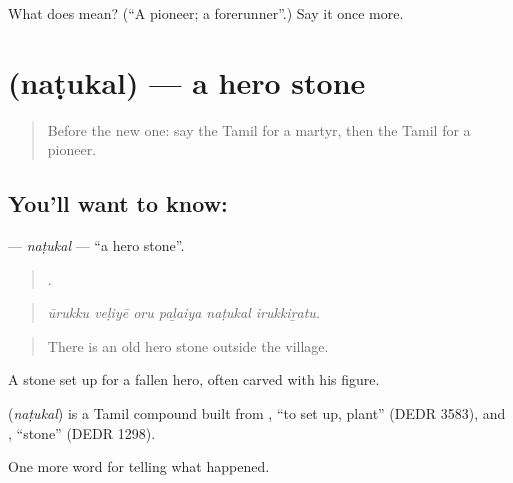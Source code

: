 \begin{tcolorbox}[breakable,colback=teal!4,colframe=teal!35!black,title={Before you move on}]
What does  mean? (\textquotedblleft{}A pioneer; a forerunner\textquotedblright{}.) Say it once more.
\end{tcolorbox}
\section[\texorpdfstring{\ta{நடுகல்} (naṭukal)}{நடுகல் (naṭukal)}]{ (naṭukal) — a hero stone}

\label{lesson:TA-C339-natukal}



\begin{quote}
Before the new one: say the Tamil for a martyr, then the Tamil for a pioneer.
\end{quote}

\subsection*{You'll want to know: }
\textbf{} — \emph{naṭukal} — \textquotedblleft{}a hero stone\textquotedblright{}.

\begin{quote}
     .
\end{quote}

\begin{quote}
\emph{ūrukku veḷiyē oru paḻaiya naṭukal irukkiṟatu.}
\end{quote}

\begin{quote}
There is an old hero stone outside the village.
\end{quote}

A stone set up for a fallen hero, often carved with his figure.

\begin{cousinweb}
\textbf{} (\emph{naṭukal}) is a Tamil compound built from , \textquotedblleft{}to set up, plant\textquotedblright{} (DEDR 3583), and , \textquotedblleft{}stone\textquotedblright{} (DEDR 1298).
\end{cousinweb}

\begin{grammarlens}[title={What you've built}]
One more word for telling what happened.
\end{grammarlens}

